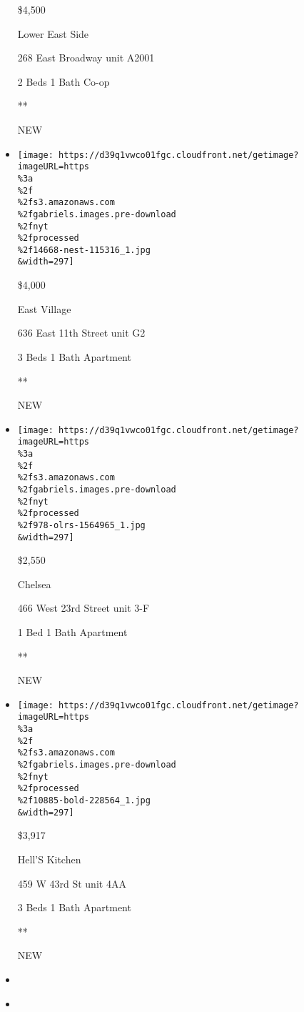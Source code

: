 \begin{itemize}
  \$4,500

  Lower East Side

  268 East Broadway unit A2001

  2 Beds \textbar{} 1 Bath \textbar{} Co-op

  **

  NEW
\item
  \href{/real-estate/usa/ny/new-york/east-village/homes-for-rent/636-east-11th-street/14668-NEST-115316?}{}

  \texttt{[image: https://d39q1vwco01fgc.cloudfront.net/getimage?imageURL=https\\\%3a\\\%2f\\\%2fs3.amazonaws.com\\\%2fgabriels.images.pre-download\\\%2fnyt\\\%2fprocessed\\\%2f14668-nest-115316\_1.jpg\\\&width=297]}

  \$4,000

  East Village

  636 East 11th Street unit G2

  3 Beds \textbar{} 1 Bath \textbar{} Apartment

  **

  NEW
\item
  \href{/real-estate/usa/ny/new-york/chelsea/homes-for-rent/466-west-23rd-street/978-OLRS-1564965?}{}

  \texttt{[image: https://d39q1vwco01fgc.cloudfront.net/getimage?imageURL=https\\\%3a\\\%2f\\\%2fs3.amazonaws.com\\\%2fgabriels.images.pre-download\\\%2fnyt\\\%2fprocessed\\\%2f978-olrs-1564965\_1.jpg\\\&width=297]}

  \$2,550

  Chelsea

  466 West 23rd Street unit 3-F

  1 Bed \textbar{} 1 Bath \textbar{} Apartment

  **

  NEW
\item
  \href{/real-estate/usa/ny/new-york/hells-kitchen/homes-for-rent/459-w-43rd-st/10885-BOLD-228564?}{}

  \texttt{[image: https://d39q1vwco01fgc.cloudfront.net/getimage?imageURL=https\\\%3a\\\%2f\\\%2fs3.amazonaws.com\\\%2fgabriels.images.pre-download\\\%2fnyt\\\%2fprocessed\\\%2f10885-bold-228564\_1.jpg\\\&width=297]}

  \$3,917

  Hell'S Kitchen

  459 W 43rd St unit 4AA

  3 Beds \textbar{} 1 Bath \textbar{} Apartment

  **

  NEW
\item
\item
  \href{/real-estate/usa/ny/brooklyn/midwood/homes-for-rent/1921-avenue-k/12436-OLRS-1891469?}{}


\end{itemize}
